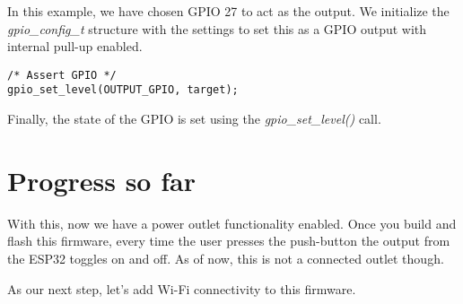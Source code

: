 \documentclass[main.tex]{subfiles}
\begin{document}
In this example, we have chosen GPIO 27 to act as the output. We initialize the \textit{gpio\_config\_t} structure with the settings to set this as a GPIO output with internal pull-up enabled.

\begin{verbatim}
/* Assert GPIO */
gpio_set_level(OUTPUT_GPIO, target);

\end{verbatim}

Finally, the state of the GPIO is set using the \textit{gpio\_set\_level()} call.

\section{Progress so far}
With this, now we have a power outlet functionality enabled. Once you build and flash this firmware, every time the user presses the push-button the output from the ESP32 toggles on and off. As of now, this is not a connected outlet though. 

As our next step, let's add Wi-Fi connectivity to this firmware.
\end{document}
